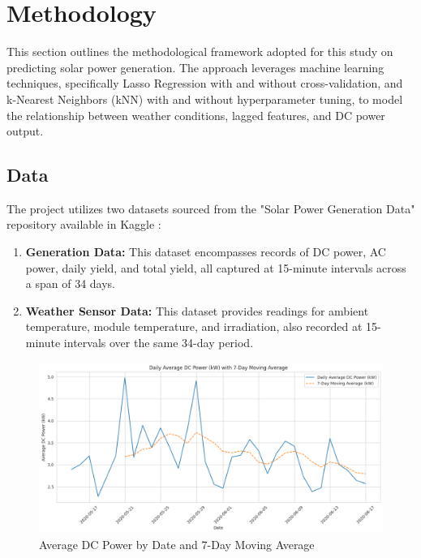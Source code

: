 \section{Methodology}

This section outlines the methodological framework adopted for this study on predicting solar power generation. The approach leverages machine learning techniques, specifically Lasso Regression with and without cross-validation, and k-Nearest Neighbors (kNN) with and without hyperparameter tuning, to model the relationship between weather conditions, lagged features, and DC power output. 

\subsection{Data}

The project utilizes two datasets sourced from the "Solar Power Generation Data" repository available in Kaggle \cite{solar-kaggle}:

\begin{enumerate}
   \item \textbf{Generation Data:} This dataset encompasses records of DC power, AC power, daily yield, and total yield, all captured at 15-minute intervals across a span of 34 days.
   \item \textbf{Weather Sensor Data:} This dataset provides readings for ambient temperature, module temperature, and irradiation, also recorded at 15-minute intervals over the same 34-day period.
\end{enumerate} 

\begin{figure}[!htpb]
    \centering
    \includegraphics[width=\linewidth]{Figures/dc_by_date_f.png}
    \caption{Average DC Power by Date and 7-Day Moving Average}
    \label{fig:dc_by_date}
\end{figure}

